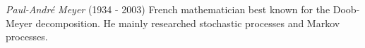 \documentclass[12pt]{article}
\begin{document}
\emph{Paul-Andr\'e Meyer} (1934 - 2003) French mathematician best known for the Doob-Meyer decomposition. He mainly researched stochastic processes and Markov processes.
\end{document}
